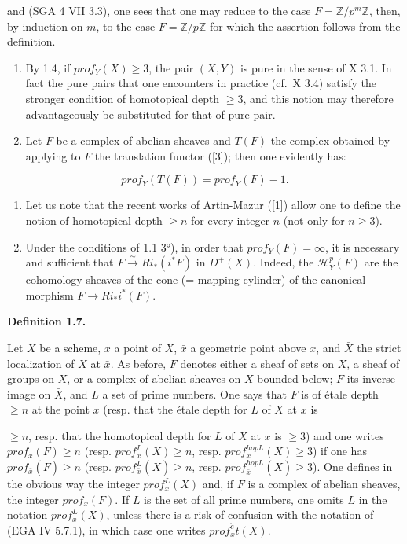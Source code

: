 \documentclass[
  11pt,
  a4paper,
]{book}
\begin{document}
and (SGA 4 VII 3.3), one sees that one may reduce to the case
\(F = \mathbb{Z}/p^{m} \mathbb{Z}\), then, by induction on \(m\), to the
case \(F = \mathbb{Z}/p\mathbb{Z}\) for which the assertion follows from
the definition.

\begin{enumerate}
\def\labelenumi{\alph{enumi})}
\setcounter{enumi}{3}
\item
  By 1.4, if \(prof_{Y}(X) \geqslant 3\), the pair \((X, Y)\) is pure in
  the sense of X 3.1. In fact the pure pairs that one encounters in
  practice (cf.~X 3.4) satisfy the stronger condition of homotopical
  depth \(\geqslant 3\), and this notion may therefore advantageously be
  substituted for that of pure pair.
\item
  Let \(F\) be a complex of abelian sheaves and \(T(F)\) the complex
  obtained by applying to \(F\) the translation functor ({[}3{]}); then
  one evidently has:
\end{enumerate}

\[ prof_{Y}(T(F)) = prof_{Y}(F) - 1. \]

\begin{enumerate}
\def\labelenumi{\alph{enumi})}
\setcounter{enumi}{5}
\item
  Let us note that the recent works of Artin-Mazur ({[}1{]}) allow one
  to define the notion of homotopical depth \(\geqslant
  n\) for every integer \(n\) (not only for \(n \geqslant 3\)).
\item
  Under the conditions of 1.1 3°), in order that
  \(prof_{Y}(F) = \infty\), it is necessary and sufficient that \(F
  \xrightarrow{\sim} Ri_{*}(i^{*} F)\) in \(D^{+}(X)\). Indeed, the
  \(\mathcal{H}^{p}_{Y}(F)\) are the cohomology sheaves of the cone (=
  mapping cylinder) of the canonical morphism \(F \to Ri_{*} i^{*}(F)\).
\end{enumerate}

\textbf{Definition 1.7.}

Let \(X\) be a scheme, \(x\) a point of \(X\), \(\bar{x}\) a geometric
point above \(x\), and \(\bar{X}\) the strict localization of \(X\) at
\(\bar{x}\). As before, \(F\) denotes either a sheaf of sets on \(X\), a
sheaf of groups on \(X\), or a complex of abelian sheaves on \(X\)
bounded below; \(\bar{F}\) its inverse image on \(\bar{X}\), and \(L\) a
set of prime numbers. One says that \(F\) is of étale depth
\(\geqslant n\) at the point \(x\) (resp. that the étale depth for \(L\)
of \(X\) at \(x\) is

\(\geqslant n\), resp. that the homotopical depth for \(L\) of \(X\) at
\(x\) is \(\geqslant 3\)) and one writes \(prof_{x}(F)
\geqslant n\) (resp. \(prof^{L}_{x}(X) \geqslant n\), resp.
\(prof^{hopL}_{x}(X) \geqslant 3\)) if one has
\(prof_{\bar{x}}(\bar{F}) \geqslant n\) (resp.
\(prof^{L}_{\bar{x}}(\bar{X}) \geqslant n\), resp.
\(prof^{hopL}_{\bar{x}}(\bar{X}) \geqslant 3\)). One defines in the
obvious way the integer \(prof^{L}_{x}(X)\) and, if \(F\) is a complex
of abelian sheaves, the integer \(prof_{x}(F)\). If \(L\) is the set of
all prime numbers, one omits \(L\) in the notation \(prof^{L}_{x}(X)\),
unless there is a risk of confusion with the notation of (EGA IV 5.7.1),
in which case one writes \(prof^{\acute{e}}_{x}t(X)\).
\end{document}
